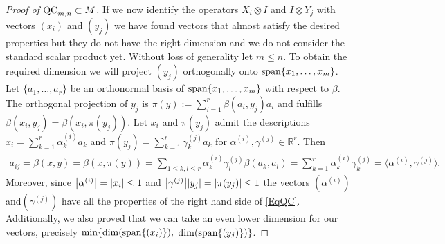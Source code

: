 \begin{proof}[Proof of $ \textup{QC}_{m,n} \subset M $]
	If we now identify the operators $ X_i \otimes I $ and $  I \otimes Y_j$ with vectors
	$ (x_i) $ and $ (y_j) $ we have found vectors that almost satisfy the desired properties but they do not have the right dimension and we do not consider the standard scalar product yet. Without loss of generality let $ m \le n $. To obtain the required dimension we will project $ (y_j) $ orthogonally onto $ \textup{span}\{ x_1,\hdots,x_m \} $.
	Let $ \{a_1,\hdots,a_r\} $ be an orthonormal basis of $ \textup{span} \{ x_1,\hdots,x_m \} $ with respect to $ \beta $. 
	The orthogonal projection of $ y_j $ is $ \pi(y):= \sum_{i=1}^{r}\beta(a_i,y_j)a_i $ and fulfills
	$ \beta(x_i,y_j) = \beta(x_i,\pi(y_j)) $. 
	Let $ x_i $ and $ \pi(y_j) $ admit the descriptions 
	$ x_i = \sum_{k=1}^{r}\alpha_k^{(i)}a_k$ and $  \pi(y_j) = \sum_{k=1}^r \gamma_k^{(j)} a_k$ for $ \alpha^{(i)}, \gamma^{(j)} \in \mathbb{R}^r $. Then
	\begin{align*}
		a_{ij}= \beta(x,y)= \beta(x,\pi(y)) = \sum_{1 \le k,l \le r} \alpha_k^{(i)} \gamma_l^{(j)} \beta(a_k,a_l) = \sum_{k=1}^{r}\alpha_k^{(i)}\gamma_k^{(j)} = \langle \alpha^{(i)}, \gamma^{(j)} \rangle.
	\end{align*}
	Moreover, since $ {\left|{\alpha^{(i)}}\right|} = {\left|{x_i}\right|} \le 1$ and ${\left|{ \gamma^{(j)}}\right|} {\left|{y_j}\right|}= {\left|{\pi(y_j)}\right|} \le 1 $ the vectors $ (\alpha^{(i)}) $ and$ (\gamma^{(j)}) $ have all the properties of the right hand side of \ref{EqQC}.
	Additionally, we also proved that we can take an even lower dimension for our vectors, precisely 
	$ \min \{ \dim( \textup{span} \{ (x_i) \}),$ $ \dim(\textup{span} \{ (y_j) \} )\} $.
\end{proof}

